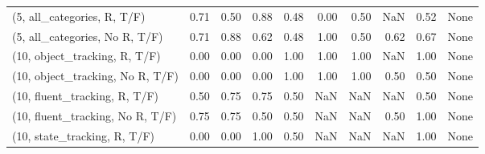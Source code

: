 \begin{table*}[h!]
\begin{adjustbox}{width=2\columnwidth,center}
\begin{tabular}{lrrr|rrr|rrr}
(5, all\_categories, R, T/F)          &                      0.71 &                  0.50 &                      0.88 &                          0.48 &                      0.00 &                          0.50 &                                    NaN &                               0.52 &                                  None \\
(5, all\_categories, No R, T/F)       &                      0.71 &                  0.88 &                      0.62 &                          0.48 &                      1.00 &                          0.50 &                                   0.62 &                               0.67 &                                  None \\



\midrule
(10, object\_tracking, R, T/F)         &                      0.00 &                  0.00 &                      0.00 &                          1.00 &                      1.00 &                          1.00 &                                    NaN &                               1.00 &                                  None \\
(10, object\_tracking, No R, T/F)      &                      0.00 &                  0.00 &                      0.00 &                          1.00 &                      1.00 &                          1.00 &                                   0.50 &                               0.50 &                                  None \\
(10, fluent\_tracking, R, T/F)         &                      0.50 &                  0.75 &                      0.75 &                          0.50 &                       NaN &                           NaN &                                    NaN &                               0.50 &                                  None \\
(10, fluent\_tracking, No R, T/F)      &                      0.75 &                  0.75 &                      0.50 &                          0.50 &                       NaN &                           NaN &                                   0.50 &                               1.00 &                                  None \\
(10, state\_tracking, R, T/F)          &                      0.00 &                  0.00 &                      1.00 &                          0.50 &                       NaN &                           NaN &                                    NaN &                               1.00 &                                  None \\

\end{tabular}
\end{adjustbox}
\end{table*}
